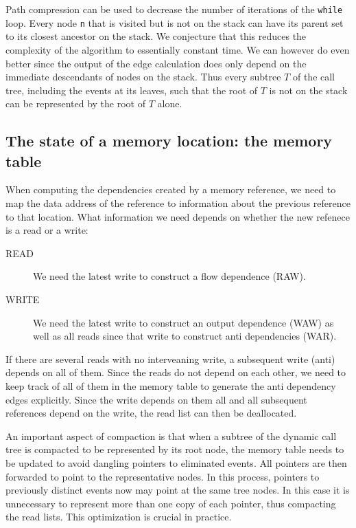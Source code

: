 \documentclass{acm_proc_article-sp}
\begin{document}
Path compression can be used to decrease the number of iterations of the 
{\tt while} loop.
Every node {\tt n} that is visited but is not on the stack can have its parent set 
to its closest ancestor on the stack. We conjecture that this reduces the 
complexity of the algorithm to essentially constant time. We can however do even 
better since the output of the edge calculation does only depend on the immediate
descendants of nodes on the stack. Thus every subtree $T$ of the call tree, 
including the events at its leaves, such
that the root of $T$ is not on the stack can be represented by the root of $T$
alone.

\subsection{The state of a memory location: the memory table}

When computing the dependencies created by a memory reference, we need to 
map the data address of the reference to information about the previous
reference to that location. What information we need depends on whether 
the new refenece is a read or a write:
\begin{description}
\item[READ]
We need the latest write to construct a flow dependence (RAW).
\item[WRITE]
We need the latest write to construct an output dependence (WAW) as well as
all reads since that write to construct anti dependencies (WAR).
\end{description}
If there are several reads with no interveaning write, a subsequent write
(anti) depends on all of them. Since the reads do not depend on each other,
we need to keep track of all of them in the memory table to generate the
anti dependency edges explicitly. Since the write depends on them all and
all subsequent references depend on the write, the read list can then be
deallocated.

An important aspect of compaction is that when a subtree of the dynamic
call tree is compacted to be represented by its root node, the memory table
needs to be updated to avoid dangling pointers to eliminated events. All
pointers are then forwarded to point to the representative nodes. In this
process, pointers to previously distinct events now may point at the same 
tree nodes. In this case it is unnecessary to represent more than one 
copy of each pointer, thus compacting the read lists. This optimization is 
crucial in practice.
\end{document}
